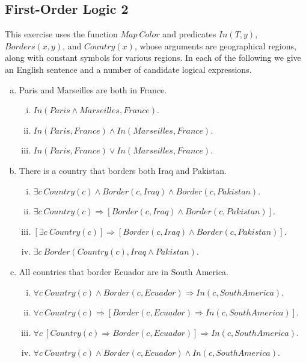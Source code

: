 \documentclass[11pt, answers]{exam}
\begin{document}
%
%
\begin{questions}
\section{First-Order Logic 2}
\question

This exercise uses the function $Map\ Color$ and predicates $In(T, y)$, $Borders (x ,y)$, and $Country(x)$, whose arguments are geographical regions, along with constant symbols for various regions. In each of the following we give an English sentence and a number of candidate logical expressions. 

\begin{enumerate}[a.]
	\item Paris and Marseilles are both in France.
	\begin{enumerate}[(i)]
		\item $In(Paris \wedge Marseilles,France)$.
		\item $In(Paris,France) \wedge In(Marseilles,France)$.
		\item $In(Paris,France) \vee In(Marseilles,France)$.
	\end{enumerate}
	\item There is a country that borders both Iraq and Pakistan.
	\begin{enumerate}[(i)]
		\item $\exists c\ Country(c) \wedge Border (c, Iraq) \wedge Border (c,Pakistan)$.
		\item $\exists c\ Country(c) \Rightarrow [Border(c, Iraq) \wedge Border (c,Pakistan)]$.
		\item $[\exists c\ Country(c)] \Rightarrow [Border(c, Iraq) \wedge Border(c,Pakistan)]$.
		\item $\exists c\ Border(Country(c), Iraq \wedge Pakistan)$.
	\end{enumerate}
	\item All countries that border Ecuador are in South America.
	\begin{enumerate}[(i)]
		\item $\forall c\ Country(c) \wedge Border (c,Ecuador ) \Rightarrow In(c, SouthAmerica)$.
		\item $\forall c\ Country(c) \Rightarrow [Border (c,Ecuador ) \Rightarrow In(c, SouthAmerica)]$.
		\item  $\forall c\ [Country(c) \Rightarrow Border (c,Ecuador )] \Rightarrow In(c, SouthAmerica)$.
		\item $\forall c\ Country(c) \wedge Border (c,Ecuador ) \wedge In(c, SouthAmerica)$.

\end{enumerate}
\end{enumerate}
\end{questions}
\end{document}
